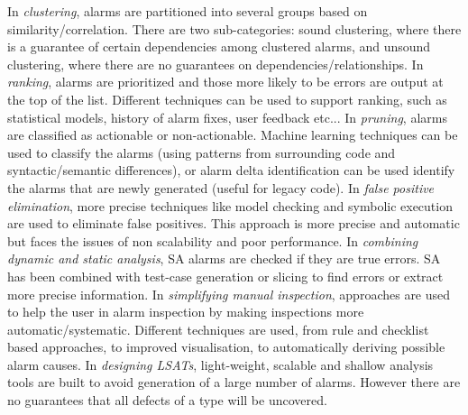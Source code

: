  In \textit{clustering}, alarms are partitioned into several groups based on similarity/correlation. There are two sub-categories: sound clustering, where there is a guarantee of certain dependencies among clustered alarms, and unsound clustering, where there are no guarantees on dependencies/relationships. 
 In \textit{ranking}, alarms are prioritized and those more likely to be errors are output at the top of the list. Different techniques can be used to support ranking, such as statistical models, history of alarm fixes, user feedback etc... 
 In \textit{pruning}, alarms are classified as actionable or non-actionable. Machine learning techniques can be used to classify the alarms (using patterns from surrounding code and syntactic/semantic differences), or alarm delta identification can be used identify the alarms that are newly generated (useful for legacy code). 
 In \textit{false positive elimination}, more precise techniques like model checking and symbolic execution are used to eliminate false positives. This approach is more precise and automatic but faces the issues of non scalability and poor performance.
 In \textit{combining dynamic and static analysis}, SA alarms are checked if they are true errors. SA has been combined with test-case generation or slicing to find errors or extract more precise information.
 In \textit{simplifying manual inspection}, approaches are used to help the user in alarm inspection by making inspections more automatic/systematic. Different techniques are used, from rule and checklist based approaches, to improved visualisation, to automatically deriving possible alarm causes.
 In \textit{designing LSATs}, light-weight, scalable and shallow analysis tools are built to avoid generation of a large number of alarms. However there are no guarantees that all defects of a type will be uncovered.

